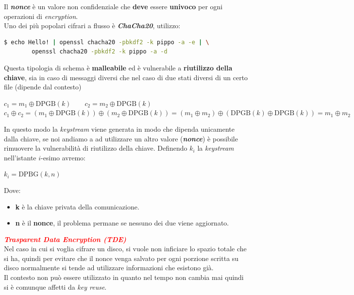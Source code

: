 \begin{flushleft}
    Il \textbf{\textit{nonce}} è un valore non confidenziale che \textbf{deve} essere \textbf{univoco} per ogni operazioni di \textit{encryption}. \\
    Uno dei più popolari cifrari a flusso è \textbf{\textit{ChaCha20}}, utilizzo:
    \begin{lstlisting}[language=bash]
    $ echo Hello! | openssl chacha20 -pbkdf2 -k pippo -a -e | \
        openssl chacha20 -pbkdf2 -k pippo -a -d
    \end{lstlisting}

    Questa tipologia di schema è \textbf{malleabile} ed è vulnerabile a \textbf{riutilizzo della chiave}, sia in caso di messaggi diversi che nel caso di due stati diversi di un certo file (dipende dal contesto)

    {\centering
        $c_1 = m_1 \oplus \text{DPGB}(k) \qquad c_2 = m_2 \oplus \text{DPGB}(k)$ \\
        $c_1 \oplus c_2 = (m_1 \oplus \text{DPGB}(k)) \oplus (m_2 \oplus \text{DPGB}(k)) = (m_1 \oplus m_2) \oplus (\text{DPGB}(k) \oplus \text{DPGB}(k)) = m_1 \oplus m_2$
    \par}

    In questo modo la \textit{keystream} viene generata in modo che dipenda unicamente dalla chiave, se noi andiamo a ad utilizzare un altro valore (\textbf{\textit{nonce}}) è possibile rimuovere la vulnerabilità di riutilizzo della chiave. Definendo $k_i$ la \textit{keystream} nell'istante $i$-esimo avremo:

    {\centering
        $k_i = \text{DPBG}(k, n)$
    \par}
    Dove:
    \begin{itemize}[nosep]
        \item \textbf{k} è la chiave privata della comunicazione.
        \item \textbf{n} è il \textbf{nonce}, il problema permane se nessuno dei due viene aggiornato.
    \end{itemize}
\end{flushleft}

\begin{flushleft}
    \textcolor{red}{\textbf{\textit{Trasparent Data Encryption (TDE)}}} \\
    Nel caso in cui si voglia cifrare un disco, si vuole non inficiare lo spazio totale che si ha, quindi per evitare che il nonce venga salvato per ogni porzione scritta su disco normalmente si tende ad utilizzare informazioni che esistono già. \\
    Il contesto non può essere utilizzato in quanto nel tempo non cambia mai quindi si è comunque affetti da \textit{key reuse}.
\end{flushleft}

